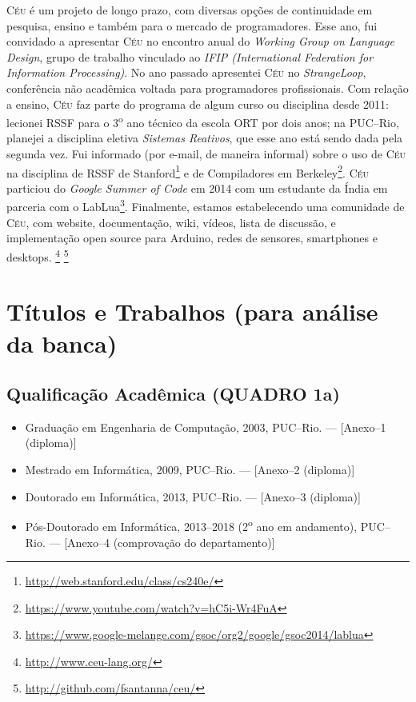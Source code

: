 \documentclass[12pt,a4paper]{article}
\newcommand{\CEU}{\textsc{C\'{e}u}\xspace}
\begin{document}
\CEU é um projeto de longo prazo, com diversas opções de continuidade em 
pesquisa, ensino e também para o mercado de programadores.
%
Esse ano, fui convidado a apresentar \CEU no encontro anual do \emph{Working 
Group on Language Design}, grupo de trabalho vinculado ao \emph{IFIP 
(International Federation for Information Processing)}.
%
No ano passado apresentei \CEU no \emph{StrangeLoop}, conferência não acadêmica 
voltada para programadores profissionais.
%
Com relação a ensino, \CEU faz parte do programa de algum curso ou disciplina 
desde 2011:
lecionei RSSF para o 3\textsuperscript{o} ano técnico da escola ORT por dois 
anos;
na PUC--Rio, planejei a disciplina eletiva \emph{Sistemas Reativos}, que esse 
ano
está sendo dada pela segunda vez.
%
Fui informado (por e-mail, de maneira informal) sobre o uso de \CEU na 
disciplina de RSSF de 
Stanford\footnote{\url{http://web.stanford.edu/class/cs240e/}} e de 
Compiladores em 
Berkeley\footnote{\url{https://www.youtube.com/watch?v=hC5i-Wr4FuA}}.
%
\CEU particiou do \emph{Google Summer of Code} em 2014 com um estudante da 
Índia em parceria com o 
LabLua\footnote{\url{https://www.google-melange.com/gsoc/org2/google/gsoc2014/lablua}}.
%
Finalmente, estamos estabelecendo uma comunidade de \CEU, com website,
documentação, wiki, vídeos, lista de discussão, e implementação open source 
para Arduino, redes de sensores, smartphones e desktops.%
\footnote{\url{http://www.ceu-lang.org/}}%
\footnote{\url{http://github.com/fsantanna/ceu/}}

\newpage
\section*{Títulos e Trabalhos (para análise da banca)}

\subsection*{Qualificação Acadêmica (QUADRO 1a)}

\begin{itemize}
\item
Graduação em Engenharia de Computação, 2003, PUC--Rio.
--- [Anexo--1 (diploma)]
\item
Mestrado em Informática, 2009, PUC--Rio.
--- [Anexo--2 (diploma)]
\item
Doutorado em Informática, 2013, PUC--Rio.
--- [Anexo--3 (diploma)]
\item
Pós-Doutorado em Informática, 2013--2018 (2\textsuperscript{o} ano em 
andamento), PUC--Rio.
--- [Anexo--4 (comprovação do departamento)]
\end{itemize}
\end{document}

